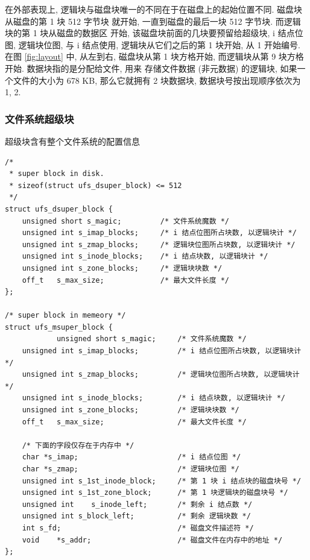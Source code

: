 \documentclass[nofonts]{ctexart}
\begin{document}
在外部表现上, 逻辑块与磁盘块唯一的不同在于在磁盘上的起始位置不同.
磁盘块从磁盘的第 1 块 512 字节块 就开始, 一直到磁盘的最后一块 512
字节块. 而逻辑块的第 1 块从磁盘的数据区 开始,
该磁盘块前面的几块要预留给超级块, i 结点位图, 逻辑块位图, 与 i 结点使用,
逻辑块从它们之后的第 1 块开始, 从 1 开始编号. 在图 \ref{fig:layout} 中,
从左到右,
磁盘块从第 1 块方格开始, 而逻辑块从第 9 块方格开始.
数据块指的是分配给文件, 用来 存储文件数据 (非元数据) 的逻辑块,
如果一个文件的大小为 678 KB, 那么它就拥有 2 块数据块,
数据块号按出现顺序依次为 1, 2.

\subsubsection{文件系统超级块}\label{ux6587ux4ef6ux7cfbux7edfux8d85ux7ea7ux5757}

超级块含有整个文件系统的配置信息

\begin{verbatim}
/*
 * super block in disk.
 * sizeof(struct ufs_dsuper_block) <= 512
 */
struct ufs_dsuper_block {
    unsigned short s_magic;         /* 文件系统魔数 */
    unsigned int s_imap_blocks;     /* i 结点位图所占块数, 以逻辑块计 */
    unsigned int s_zmap_blocks;     /* 逻辑块位图所占块数, 以逻辑块计 */
    unsigned int s_inode_blocks;    /* i 结点块数, 以逻辑块计 */
    unsigned int s_zone_blocks;     /* 逻辑块块数 */
    off_t   s_max_size;             /* 最大文件长度 */
};

/* super block in memeory */
struct ufs_msuper_block {
            unsigned short s_magic;     /* 文件系统魔数 */
    unsigned int s_imap_blocks;         /* i 结点位图所占块数, 以逻辑块计 */
    unsigned int s_zmap_blocks;         /* 逻辑块位图所占块数, 以逻辑块计 */
    unsigned int s_inode_blocks;        /* i 结点块数, 以逻辑块计 */
    unsigned int s_zone_blocks;         /* 逻辑块块数 */
    off_t   s_max_size;                 /* 最大文件长度 */

    /* 下面的字段仅存在于内存中 */
    char *s_imap;                       /* i 结点位图 */
    char *s_zmap;                       /* 逻辑块位图 */
    unsigned int s_1st_inode_block;     /* 第 1 块 i 结点块的磁盘块号 */
    unsigned int s_1st_zone_block;      /* 第 1 块逻辑块的磁盘块号 */
    unsigned int    s_inode_left;       /* 剩余 i 结点数 */
    unsigned int s_block_left;          /* 剩余 逻辑块数 */
    int s_fd;                           /* 磁盘文件描述符 */
    void    *s_addr;                    /* 磁盘文件在内存中的地址 */
};
\end{verbatim}
\end{document}
